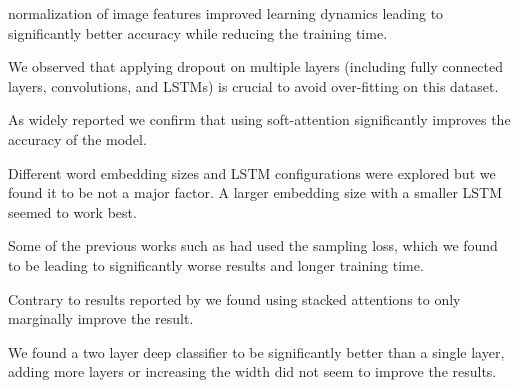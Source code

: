 \documentclass[10pt,twocolumn,letterpaper]{article}
\begin{document}
 normalization of image features improved learning dynamics leading to significantly better accuracy while reducing the training time.

We observed that applying dropout on multiple layers (including fully connected layers, convolutions, and LSTMs) is crucial to avoid over-fitting on this dataset.

As widely reported we confirm that using soft-attention significantly improves the accuracy of the model. 

Different word embedding sizes and LSTM configurations were explored but we found it to be not a major factor. A larger embedding size with a smaller LSTM seemed to work best.

Some of the previous works such as \cite{Fukui2016MultimodalCB} had used the sampling loss, which we found to be leading to significantly worse results and longer training time.

Contrary to results reported by \cite{Yang2016StackedAN} we found using stacked attentions to only marginally improve the result.

We found a two layer deep classifier to be significantly better than a single layer, adding more layers or increasing the width did not seem to improve the results. 
\end{document}
